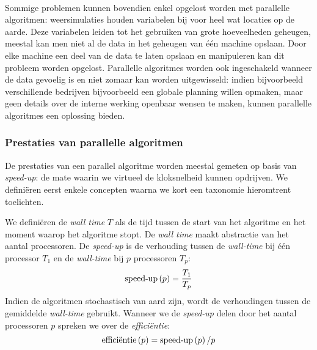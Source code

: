 \paragraph{}
Sommige problemen kunnen bovendien enkel opgelost worden met parallelle algoritmen: weersimulaties houden variabelen bij voor heel wat locaties op de aarde. Deze variabelen leiden tot het gebruiken van grote hoeveelheden geheugen, meestal kan men niet al de data in het geheugen van \'e\'en machine opslaan. Door elke machine een deel van de data te laten opslaan en manipuleren kan dit probleem worden opgelost. Parallelle algoritmes worden ook ingeschakeld wanneer de data gevoelig is en niet zomaar kan worden uitgewisseld: indien bijvoorbeeld verschillende bedrijven bijvoorbeeld een globale planning willen opmaken, maar geen details over de interne werking openbaar wensen te maken, kunnen parallelle algoritmes een oplossing bieden\cite{Gaspero_amultiagent}.

\subsubsection{Prestaties van parallelle algoritmen}

De prestaties van een parallel algoritme worden meestal gemeten op basis van \emph{speed-up}: de mate waarin we virtueel de kloksnelheid kunnen opdrijven. We defini\"eren eerst enkele concepten waarna we kort een taxonomie hieromtrent toelichten.

\begin{definition}
We defini\"eren de \emph{wall time} $T$ als de tijd tussen de start van het algoritme en het moment waarop het algoritme stopt. De \emph{wall time} maakt abstractie van het aantal processoren. De \emph{speed-up} is de verhouding tussen de \emph{wall-time} bij \'e\'en processor $T_1$ en de \emph{wall-time} bij $p$ processoren $T_p$:
\begin{equation}
\mbox{speed-up}\left(p\right)=\displaystyle\frac{T_1}{T_p}
\end{equation}
Indien de algoritmen stochastisch van aard zijn, wordt de verhoudingen tussen de gemiddelde \emph{wall-time} gebruikt.
Wanneer we de \emph{speed-up} delen door het aantal processoren $p$ spreken we over de \emph{effici\"entie}:
\begin{equation}
\mbox{effici\"entie}\left(p\right)=\mbox{speed-up}\left(p\right)/p
\end{equation}
\end{definition}

